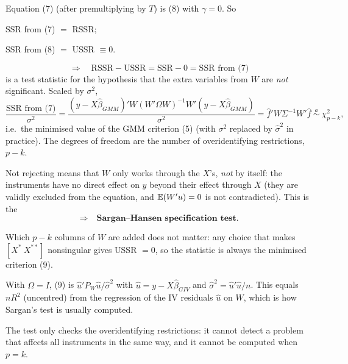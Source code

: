 \documentclass[11pt]{article}
\begin{document}
 Equation (7) (after premultiplying by $T$) is (8) with $\gamma=0$. So
\begin{flatlist}
 \item SSR from (7) $=$ RSSR;
 \item SSR from (8) $=$ USSR $\equiv0$.
\end{flatlist}
\[ \Longrightarrow\quad \text{RSSR}-\text{USSR}=\text{SSR}-0=\text{SSR from (7)} \]
is a test statistic for the hypothesis that the extra variables from $W$ are \emph{not} significant. Scaled by
$\sigma^{2}$,
\begin{equation}\tag{9}
 \frac{\text{SSR from (7)}}{\sigma^{2}}
 =\frac{(y-X\hat\beta_{GMM})'W(W'\Omega W)^{-1}W'(y-X\hat\beta_{GMM})}{\sigma^{2}}
 =\hat f'W\Sigma^{-1}W'\hat f
 \ \overset{a}{\sim}\ \chi^{2}_{p-k},
\end{equation}
i.e.\ the minimised value of the GMM criterion (5) (with $\sigma^{2}$ replaced by $\hat\sigma^{2}$ in practice). The degrees of
freedom are the number of overidentifying restrictions, $p-k$.

 Not rejecting means that $W$ only works through the $X$'s, \emph{not} by itself: the
instruments have no direct effect on $y$ beyond their effect through $X$ (they are validly excluded from
the equation, and $\mathbb{E}(W'u)=0$ is not contradicted). This is the
\[ \Longrightarrow\quad\textbf{Sargan--Hansen specification test.} \]

\begin{flatnum}
 \item Which $p-k$ columns of $W$ are added does not matter: any choice that makes $[X^{*}\ X^{**}]$
       nonsingular gives USSR $=0$, so the statistic is always the minimised criterion (9).
 \item With $\Omega=I$, (9) is $\hat u'P_{W}\hat u/\hat\sigma^{2}$ with $\hat u=y-X\hat\beta_{GIV}$ and $\hat\sigma^{2}=\hat u'\hat u/n$. This
       equals $nR^{2}$ (uncentred) from the regression of the IV residuals $\hat u$ on $W$, which is how Sargan's
       test is usually computed.
 \item The test only checks the overidentifying restrictions: it cannot detect a problem that affects all
       instruments in the same way, and it cannot be computed when $p=k$.
\end{flatnum}
\end{document}
